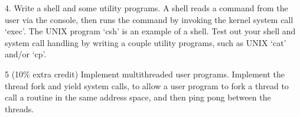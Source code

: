 \begin{description}
\item{4.}
Write a shell and some utility programs.  A shell reads a command
from the user via the console, then runs the command by invoking
the kernel system call `exec'.
The UNIX program `csh' is an example of a shell.
Test out your shell and system call handling by writing a couple
utility programs, such as UNIX `cat' and/or `cp'.

\item{5 (10\% extra credit)} Implement multithreaded user programs.
Implement the thread fork and yield system calls, to allow a user
program to fork a thread to call a routine in the same address space,
and then ping pong between the threads.

\end{description}


